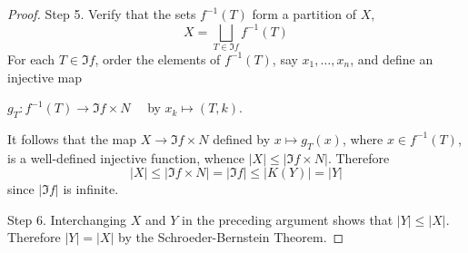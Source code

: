 \begin{theorem}
\begin{proof}
        Step 5.
        Verify that the sets $f^{-1}(T)$ form a partition of $X$,
        \begin{equation*}
            X= \bigsqcup_{T \in \Im f} f^{-1}\left(T\right)
        \end{equation*}
        For each $T \in \Im f$, order the elements of $f^{-1}(T)$, say $x_1, \ldots, x_n$, and define an injective map \begin{center}
            $g_T: f^{-1}(T) \rightarrow \Im f \times {N}\quad $ by $x_k \mapsto(T, k)$.
        \end{center}
        It follows that the map $X \rightarrow \Im f \times {N}$ defined by $x \mapsto g_T(x)$, where $x \in f^{-1}(T)$, is a well-defined injective function, whence $|X| \leq|\Im f \times {N}|$.
        Therefore
        \begin{equation*}
            \left|X\right|
            \leq
            \left|\Im f \times {N}\right|
            =
            \left|\Im f\right|
            \leq|K(Y)|
            =
            \left|Y\right|
        \end{equation*}
        since $\left|\Im f\right|$ is infinite.

        Step 6.
        Interchanging $X$ and $Y$ in the preceding argument shows that $|Y| \leq|X|$. Therefore $|Y|=|X|$ by the Schroeder-Bernstein Theorem.
    \end{proof}
\end{theorem}

